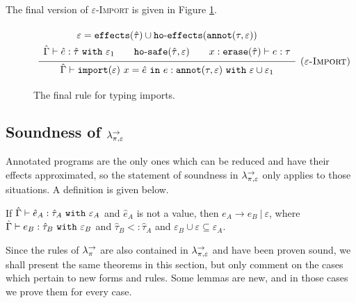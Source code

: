 The final version of \textsc{$\varepsilon$-Import} is given in Figure \ref{fig:import_rule}.

\begin{figure}[h]

\noindent
{}

\[
\begin{array}{c}

\infer[\textsc{($\varepsilon$-Import)}]
	{ \hat \Gamma \vdash \kwa{import}(\varepsilon)~x = \hat e~\kw{in} e: \kwa{annot}(\tau, \varepsilon)~\kw{with} \varepsilon \cup \varepsilon_1 }
{{\def\arraystretch{1.4}
  \begin{array}{c}
\varepsilon = \kwa{effects}(\hat \tau) \cup \hofx{\annot{\tau}{\varepsilon}} \\
\hat \Gamma \vdash \hat e: \hat \tau~\kw{with} \varepsilon_1 ~~~~~~ \kwa{ho \hyphen safe}(\hat \tau, \varepsilon) ~~~~~~ x: \kwa{erase}(\hat \tau) \vdash e: \tau
  \end{array}}} 
 
\end{array}
\]


\vspace{-7pt}
\caption{The final rule for typing imports.}
\label{fig:import_rule}
\end{figure}




\subsection{Soundness of $\lambda^{\rightarrow}_{\pi, \varepsilon}$}

Annotated programs are the only ones which can be reduced and have their effects approximated, so the statement of soundness in $\lambda^{\rightarrow}_{\pi, \varepsilon}$ only applies to those situations. A definition is given below.

\begin{theorem}[Soundness]
If $\hat \Gamma \vdash \hat e_A: \hat \tau_A~\mathtt{with}~ \varepsilon_A$ and $\hat e_A$ is not a value, then $e_A \longrightarrow e_B~|~\varepsilon$, where $\hat \Gamma \vdash e_B: \hat \tau_B~\mathtt{with}~ \varepsilon_B$ and $\hat \tau_B <: \hat \tau_A$ and $\varepsilon_B \cup \varepsilon \subseteq \varepsilon_A$.
\end{theorem}

Since the rules of $\lambda^{\rightarrow}_{\pi}$ are also contained in $\lambda^{\rightarrow}_{\pi, \varepsilon}$ and have been proven sound, we shall present the same theorems in this section, but only comment on the cases which pertain to new forms and rules. Some lemmas are new, and in those cases we prove them for every case.

